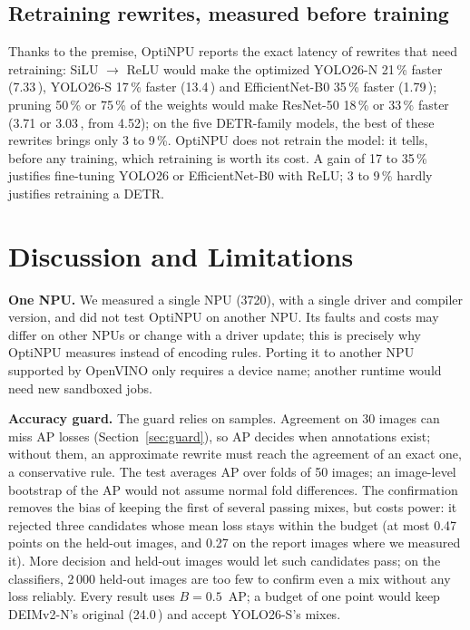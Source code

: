 \documentclass[conference]{IEEEtran}
\newcommand{\tool}{OptiNPU}
\newcommand{\ms}{\,\text{ms}}
\begin{document}
\subsection{Retraining rewrites, measured before training}

Thanks to the premise, \tool{} reports the exact latency of rewrites that need retraining: SiLU $\to$ ReLU would make the optimized YOLO26-N 21\,\% faster (7.33\ms{}), YOLO26-S 17\,\% faster (13.4\ms{}) and EfficientNet-B0 35\,\% faster (1.79\ms{}); pruning 50\,\% or 75\,\% of the weights would make ResNet-50 18\,\% or 33\,\% faster (3.71 or 3.03\ms{}, from 4.52); on the five DETR-family models, the best of these rewrites brings only 3 to 9\,\%.
\tool{} does not retrain the model: it tells, before any training, which retraining is worth its cost. A gain of 17 to 35\,\% justifies fine-tuning YOLO26 or EfficientNet-B0 with ReLU; 3 to 9\,\% hardly justifies retraining a DETR.

\section{Discussion and Limitations}
\label{sec:limits}

\textbf{One NPU.} We measured a single NPU (3720), with a single driver and compiler version, and did not test \tool{} on another NPU. Its faults and costs may differ on other NPUs or change with a driver update; this is precisely why \tool{} measures instead of encoding rules. Porting it to another NPU supported by OpenVINO only requires a device name; another runtime would need new sandboxed jobs.

\textbf{Accuracy guard.} The guard relies on samples. Agreement on 30 images can miss AP losses (Section~\ref{sec:guard}), so AP decides when annotations exist; without them, an approximate rewrite must reach the agreement of an exact one, a conservative rule. The test averages AP over folds of 50 images; an image-level bootstrap of the AP would not assume normal fold differences. The confirmation removes the bias of keeping the first of several passing mixes, but costs power: it rejected three candidates whose mean loss stays within the budget (at most 0.47 points on the held-out images, and 0.27 on the report images where we measured it). More decision and held-out images would let such candidates pass; on the classifiers, 2\,000 held-out images are too few to confirm even a mix without any loss reliably. Every result uses $B = 0.5$~AP; a budget of one point would keep DEIMv2-N's original (24.0\ms{}) and accept YOLO26-S's mixes.
\end{document}
